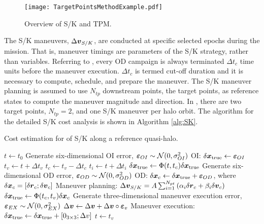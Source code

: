 %
\begin{figure}[]
	\centering
	\texttt{[image: TargetPointsMethodExample.pdf]}
	\caption{Overview of S/K and TPM.}
	\label{fig:TargetPointsMethodExample}
\end{figure}
%
The S/K maneuvers, $\Delta\boldsymbol{v}_{S/K}$, are conducted at specific selected epochs during the mission. That is, maneuver timings are parameters of the S/K strategy, rather than variables. Referring to , every {OD} campaign is always terminated $\Delta t_c$ time units before the maneuver execution. $\Delta t_c$ is termed cut-off duration and it is necessary to compute, schedule, and prepare the  maneuver. The S/K maneuver planning is assumed to use $N_{tp}$ downstream points, \ie the target points, as reference states to compute the maneuver magnitude and direction. In , there are two target points, $N_{tp} = 2$, and one S/K maneuver per halo orbit. The algorithm for the detailed S/K cost analysis is shown in Algorithm \ref{alg:SK}.

%
\begin{algorithm}[]
	\caption{Cost estimation for of S/K along a reference quasi-halo.}\label{alg:SK}
	\begin{algorithmic}[1]
		\State $t\gets t_0$
		\State Generate six-dimensional OI error, $\boldsymbol{\varepsilon}_{OI}\sim\mathcal{N}(0,\sigma_{OI}^2)$
		\State OI: $\delta \boldsymbol{x}_{\textrm{true}}\gets\boldsymbol{\varepsilon}_{OI}$
		\State $t_v\gets t+\Delta t_v$
		\State $t_c\gets t_v-\Delta t_c$
		\State $t_i\gets t+\Delta t_i$
		\State $\delta \boldsymbol{x}_{\textrm{true}}\gets \Phi(t,t_c)\delta \boldsymbol{x}_{\textrm{true}}$
		\State Generate six-dimensional OD error, $\boldsymbol{\varepsilon}_{OD}\sim\mathcal{N}(0,\sigma_{OD}^2)$
		\State OD: $\delta \boldsymbol{x}_{c}\gets\delta \boldsymbol{x}_{\textrm{true}}+\boldsymbol{\varepsilon}_{OD}$, where $\delta \boldsymbol{x}_{c} = [\delta \boldsymbol{r}_{c};\delta \boldsymbol{v}_{c}]$
		\State Maneuver planning: $\Delta\boldsymbol{v}_{S/K} = A\sum_{i=1}^{N_{pt}}\left(\alpha_i\delta\boldsymbol{r}_c+\beta_i\delta\boldsymbol{v}_c\right)$ 
		\State $\delta \boldsymbol{x}_{\textrm{true}}\gets \Phi(t_c,t_v)\delta \boldsymbol{x}_{c}$
		\State Generate three-dimensional maneuver execution error, $\boldsymbol{\varepsilon}_{EX}\sim\mathcal{N}(0,\sigma_{EX}^2)$
		\State $\Delta\boldsymbol{v}\gets\Delta\boldsymbol{v}+\Delta\boldsymbol{v}\circ\boldsymbol{\varepsilon}_v$ 
		\State Maneuver execution: $\delta \boldsymbol{x}_{\textrm{true}}\gets\delta \boldsymbol{x}_{\textrm{true}}+[0_{3\times3};\Delta v]$
		\State $t\gets t_v$
		\EndWhile
		\EndFunction
	\end{algorithmic}
\end{algorithm}
% 

